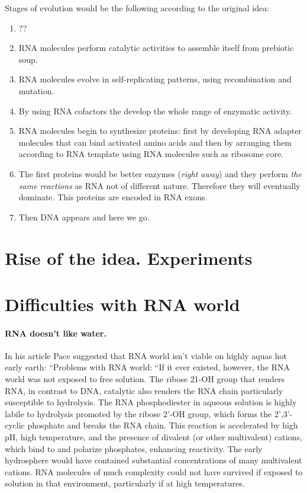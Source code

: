 \documentclass[12pt]{paper}
\begin{document}
Stages of evolution would be the following according to the original idea:
\begin{enumerate}
 \item ??
 \item RNA molecules perform catalytic activities to  assemble itself from prebiotic soup.
 \item RNA molecules evolve in self-replicating patterns, using recombination and mutation.
 \item By using RNA cofactors the develop the whole range of enzymatic activity.
 \item RNA molecules begin to synthesize proteins: first by developing RNA adapter molecules that 
can bind activated amino acids and then by arranging them according to RNA template using RNA 
molecules such as ribosome core.
\item The first proteins would be better enzymes (\textit{right away}) and they perform \textit{the 
same reactions} as RNA not of different nature. Therefore they will eventually dominate.
This proteins are encoded in RNA exons.
\item Then DNA appears and here we go.
\end{enumerate}





\section{Rise of the idea. Experiments}

\section{Difficulties with RNA world}
\paragraph{RNA doesn't like water.} In his article \cite{Pace1991} Pace suggested that RNA world 
isn't viable on highly aquas hot early earth: ``Problems with RNA world: ``If it ever existed, 
however, the RNA world was not exposed to free solution. The ribose 21-OH group that renders
RNA, in contrast to DNA, catalytic also renders the RNA
chain particularly susceptible to hydrolysis. The RNA
phosphodiester  in aqueous solution is highly labile to hydrolysis promoted by the ribose 2'-OH 
group, which forms the 2',3'-cyclic phosphate and breaks the RNA chain. This
reaction is accelerated by high pH, high temperature, and
the presence of divalent (or other multivalent) cations,
which bind to and polarize phosphates, enhancing reactivity. The early hydrosphere would have 
contained substantial concentrations of many multivalent cations. RNA molecules of much complexity 
could not have survived if exposed to solution in that environment, particularly if at
high temperatures. 
\end{document}
